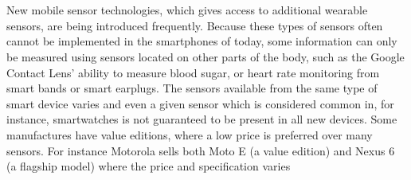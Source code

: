 \\\\
New mobile sensor technologies, which gives access to additional wearable sensors, are being introduced frequently. Because these types of sensors often cannot be implemented in the smartphones of today, some information can only be measured using sensors located on other parts of the body, such as the Google Contact Lens' ability to measure blood sugar, or heart rate monitoring from smart bands or smart earplugs. The sensors available from the same type of smart device varies and even a given sensor which is considered common in, for instance, smartwatches is not guaranteed to be present in all new devices. Some manufactures have value editions, where a low price is preferred over many sensors. For instance Motorola sells both Moto E (a value edition) and Nexus 6 (a flagship model) where the price and specification varies \parencite{moto_e_compared_to_nexus_6}


